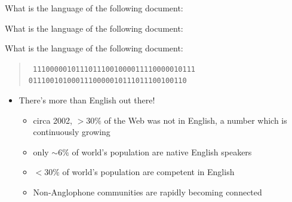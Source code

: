 \documentclass[a4paper,landscape,headrule,footrule,xetex]{foils}
\begin{document}

What is the language of the following document: \\[24pt]










What is the language of the following document: \\[24pt]
 





What is the language of the following document:

\begin{minipage}[t]{1.0\linewidth}
\begin{quote}
\tt
11100000101110111001000011110000010111
0111001010001110000010111011100100110
\end{quote}
\end{minipage}








\MyLogo{}
\begin{itemize}
\item There's more than English out there!
\begin{itemize}
\item circa 2002, $>30\%$ of the Web was not in English, a number which
  is continuously growing
\item only $\sim 6\%$ of world's population are native English speakers
\item $<30\%$ of world's population are competent in English
\item Non-Anglophone communities are rapidly becoming connected
\end{itemize}
\end{itemize}




\end{document}
